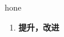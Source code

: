 
\begin{frame}
{\huge hone}
\begin{center}
\begin{enumerate}\Large
  \item \textbf{提升，改进}
\end{enumerate}
\end{center}
\end{frame}
